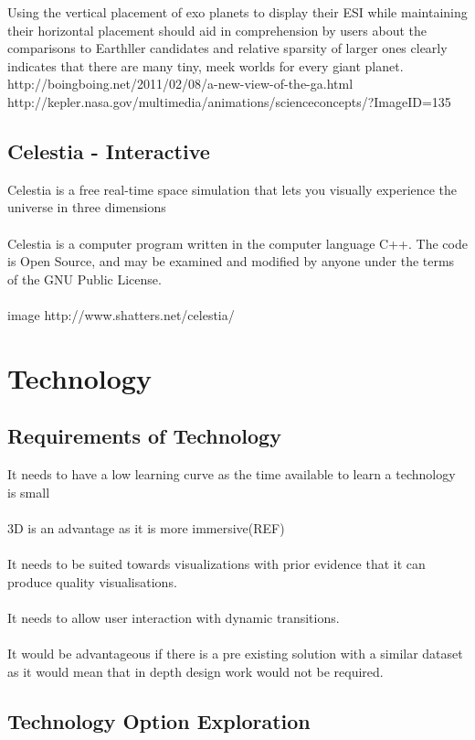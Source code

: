 \documentclass[11pt
              , a4paper
              , twoside
              , openright
              ]{report}
\begin{document}
Using the vertical placement of exo planets to display their ESI while maintaining their horizontal placement should aid in comprehension by users about the comparisons to Earthller candidates and relative sparsity of larger ones clearly indicates that there are many tiny, meek worlds for every giant planet.
http://boingboing.net/2011/02/08/a-new-view-of-the-ga.html
http://kepler.nasa.gov/multimedia/animations/scienceconcepts/?ImageID=135
\section{Celestia - Interactive}
Celestia is a free real-time space simulation that lets you visually experience the universe in three dimensions
\\\\
Celestia is a computer program written in the computer language C++.  The code is Open Source, and may be examined and modified by anyone under the terms of the GNU Public License.
\\\\
image
http://www.shatters.net/celestia/
\chapter{Technology}
\section{Requirements of Technology}
It needs to have a low learning curve as the time available to learn a technology is small
\\\\
3D is an advantage as it is more immersive(REF)
\\\\
It needs to be suited towards visualizations with prior evidence that it can produce quality visualisations.
\\\\
It needs to allow user interaction with dynamic transitions.
\\\\
It would be advantageous  if there is a pre existing solution with a similar dataset as it would mean that in depth design work would not be required.
\section{Technology Option Exploration}
\end{document}
